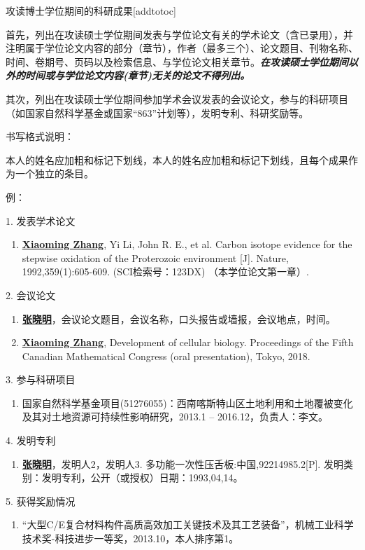 
\begin{personalcv}{攻读博士学位期间的科研成果}[addtotoc]

首先，列出在攻读硕士学位期间发表与学位论文有关的学术论文（含已录用），并注明属于学位论文内容的部分（章节），作者（最多三个）、论文题目、刊物名称、时间、卷期号、页码以及检索信息、与学位论文相关章节。{\bf\itshape 在攻读硕士学位期间以外的时间或与学位论文内容(章节)无关的论文不得列出。}

其次，列出在攻读硕士学位期间参加学术会议发表的会议论文，参与的科研项目（如国家自然科学基金或国家“863”计划等），发明专利、科研奖励等。

书写格式说明：

本人的姓名应加粗和标记下划线，本人的姓名应加粗和标记下划线，且每个成果作为一个独立的条目。

例：

1. 发表学术论文
\begin{enumerate}[nosep, label=$\lbrack$\arabic*$\rbrack$]
  \item{\underline{\bf Xiaoming Zhang}, Yi Li, John R. E., et al. Carbon isotope evidence for the stepwise oxidation of the Proterozoic environment [J]. Nature, 1992,359(1):605-609. (SCI检索号：123DX) （本学位论文第一章）.}
\end{enumerate}{}\vspace{1em}

2. 会议论文
\begin{enumerate}[nosep, label=$\lbrack$\arabic*$\rbrack$]
  \item{\underline{\bf 张晓明}，会议论文题目，会议名称，口头报告或墙报，会议地点，时间。}
  \item{\underline{\bf Xiaoming Zhang}, Development of cellular biology. Proceedings of the Fifth Canadian Mathematical Congress (oral presentation), Tokyo, 2018.}
\end{enumerate}{}\vspace{1em}

3. 参与科研项目
\begin{enumerate}[nosep, label=$\lbrack$\arabic*$\rbrack$]
  \item{国家自然科学基金项目(51276055)：西南喀斯特山区土地利用和土地覆被变化及其对土地资源可持续性影响研究，2013.1 – 2016.12，负责人：李文。} %
\end{enumerate}{}\vspace{1em}

4. 发明专利
\begin{enumerate}[nosep, label=$\lbrack$\arabic*$\rbrack$]
  \item{\underline{\bf 张晓明}，发明人2，发明人3. 多功能一次性压舌板:中国,92214985.2[P]. 发明类别：发明专利，公开（或授权）日期：1993,04,14。}
\end{enumerate}{}\vspace{1em}

5. 获得奖励情况
\begin{enumerate}[nosep, label=$\lbrack$\arabic*$\rbrack$]
  \item{“大型C/E复合材料构件高质高效加工关键技术及其工艺装备”，机械工业科学技术奖-科技进步一等奖，2013.10，本人排序第1。}
\end{enumerate}

\end{personalcv}


